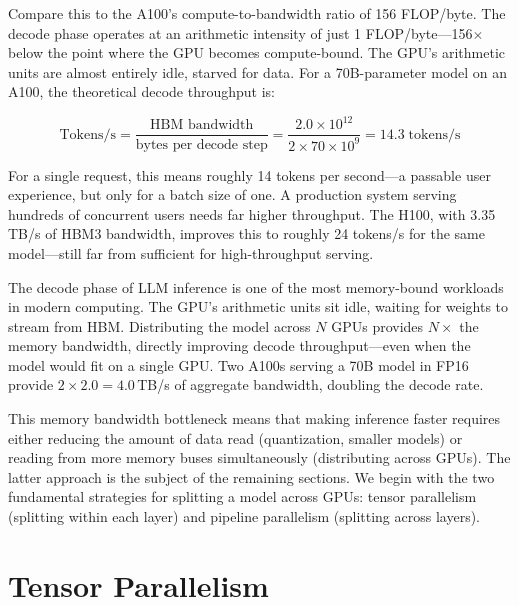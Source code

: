 %
Compare this to the A100's compute-to-bandwidth ratio of 156 FLOP/byte. The decode phase operates at an arithmetic intensity of just 1 FLOP/byte---156$\times$ below the point where the GPU becomes compute-bound. The GPU's arithmetic units are almost entirely idle, starved for data. For a 70B-parameter model on an A100, the theoretical decode throughput is:

\begin{equation}
\label{eq:decode-throughput}
\text{Tokens/s} = \frac{\text{HBM bandwidth}}{\text{bytes per decode step}} = \frac{2.0 \times 10^{12}}{2 \times 70 \times 10^9} = 14.3 \;\text{tokens/s}
\end{equation}

\noindent For a single request, this means roughly 14 tokens per second---a passable user experience, but only for a batch size of one. A production system serving hundreds of concurrent users needs far higher throughput. The H100, with 3.35\,TB/s of HBM3 bandwidth, improves this to roughly 24 tokens/s for the same model---still far from sufficient for high-throughput serving.

\begin{insightbox}
The decode phase of LLM inference is one of the most memory-bound workloads in modern computing. The GPU's arithmetic units sit idle, waiting for weights to stream from HBM. Distributing the model across $N$ GPUs provides $N\times$ the memory bandwidth, directly improving decode throughput---even when the model would fit on a single GPU. Two A100s serving a 70B model in FP16 provide $2 \times 2.0 = 4.0$\,TB/s of aggregate bandwidth, doubling the decode rate.
\end{insightbox}

This memory bandwidth bottleneck means that making inference faster requires either reducing the amount of data read (quantization, smaller models) or reading from more memory buses simultaneously (distributing across GPUs). The latter approach is the subject of the remaining sections. We begin with the two fundamental strategies for splitting a model across GPUs: tensor parallelism (splitting within each layer) and pipeline parallelism (splitting across layers).

\section{Tensor Parallelism}
\label{sec:distributed:tensor}

